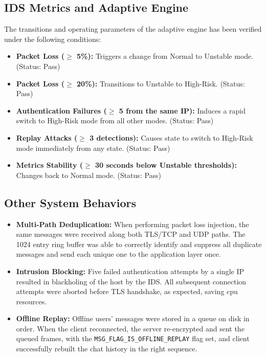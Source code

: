 \documentclass[conference]{IEEEtran}
\begin{document}
\subsection{IDS Metrics and Adaptive Engine}

The transitions and operating parameters of the adaptive engine has been verified under the following conditions:
\begin{itemize}
    \item \textbf{Packet Loss ($\ge$ 5\%):} Triggers a change from Normal to Unstable mode. (Status: Pass)
    \item \textbf{Packet Loss ($\ge$ 20\%):} Transitions to Unstable to High-Risk. (Status: Pass)
    \item \textbf{Authentication Failures ($\ge$ 5 from the same IP):} Induces a rapid switch to High-Risk mode from all other modes. (Status: Pass)
    \item \textbf{Replay Attacks ($\ge$ 3 detections):} Causes state to switch to High-Risk mode immediately from any state. (Status: Pass)
    \item \textbf{Metrics Stability ($\ge$ 30 seconds below Unstable thresholds):} Changes back to Normal mode. (Status: Pass)
\end{itemize}

\subsection{Other System Behaviors}

\begin{itemize}
    \item \textbf{Multi-Path Deduplication:} When performing packet loss injection, the same messages were received along both TLS/TCP and UDP paths. The 1024 entry ring buffer was able to correctly identify and suppress all duplicate messages and send each unique one to the application layer once.
    \item \textbf{Intrusion Blocking:} Five failed authentication attempts by a single IP resulted in blackholing of the host by the IDS. All subsequent connection attempts were aborted before TLS handshake, as expected, saving cpu resources.
    \item \textbf{Offline Replay:} Offline users' messages were stored in a queue on disk in order. When the client reconnected, the server re-encrypted and sent the queued frames, with the \texttt{MSG\_FLAG\_IS\_OFFLINE\_REPLAY} flag set, and client successfully rebuilt the chat history in the right sequence.
\end{itemize}
\end{document}
